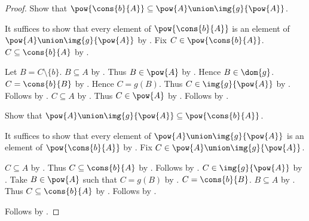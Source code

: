 \begin{proof}
    Show that $\pow{\cons{b}{A}}\subseteq
        \pow{A}\union\img{g}{\pow{A}}$.
    \begin{subproof}
        It suffices to show that every element of $\pow{\cons{b}{A}}$ is
            an element of $\pow{A}\union\img{g}{\pow{A}}$
            by .
        Fix $C\in\pow{\cons{b}{A}}$.
        $C\subseteq\cons{b}{A}$ by .
        \begin{byCase}
            Let $B=C\setminus\{b\}$.
            $B\subseteq A$ by .
            Thus $B\in\pow{A}$ by .
            Hence $B\in\dom{g}$.
            $C=\cons{b}{B}$ by .
            Hence $C=g(B)$.
            Thus $C\in\img{g}{\pow{A}}$
                by .
            Follows by .
            $C\subseteq A$ by .
            Thus $C\in\pow{A}$ by .
            Follows by .
        \end{byCase}
    \end{subproof}

    Show that $\pow{A}\union\img{g}{\pow{A}}
        \subseteq\pow{\cons{b}{A}}$.
    \begin{subproof}
        It suffices to show that every element of
            $\pow{A}\union\img{g}{\pow{A}}$ is an element of
            $\pow{\cons{b}{A}}$ by .
        Fix $C\in\pow{A}\union\img{g}{\pow{A}}$.
        \begin{byCase}
            $C\subseteq A$ by .
            Thus $C\subseteq\cons{b}{A}$ by .
            Follows by .
            $C\in\img{g}{\pow{A}}$ by .
            Take $B\in\pow{A}$ such that $C=g(B)$
                by .
            $C=\cons{b}{B}$.
            $B\subseteq A$ by .
            Thus $C\subseteq\cons{b}{A}$
                by .
            Follows by .
        \end{byCase}
    \end{subproof}
    Follows by .
\end{proof}

